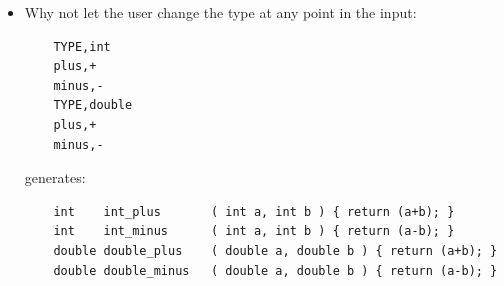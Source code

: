 \documentclass[handout,]{beamer}
\newcommand{\pitem}{\pause \item}
\begin{document}
\begin{frame}[fragile]
\begin{itemize}
   \pitem
   Why not let the user change the type at any point in the input:

\tiny
\begin{verbatim}
    TYPE,int
    plus,+
    minus,-
    TYPE,double
    plus,+
    minus,-
\end{verbatim}
\small

generates:

\tiny
\begin{verbatim}
    int    int_plus       ( int a, int b ) { return (a+b); }
    int    int_minus      ( int a, int b ) { return (a-b); }
    double double_plus    ( double a, double b ) { return (a+b); }
    double double_minus   ( double a, double b ) { return (a-b); }
\end{verbatim}
\small

    \end{itemize}
\end{frame}
\end{document}
